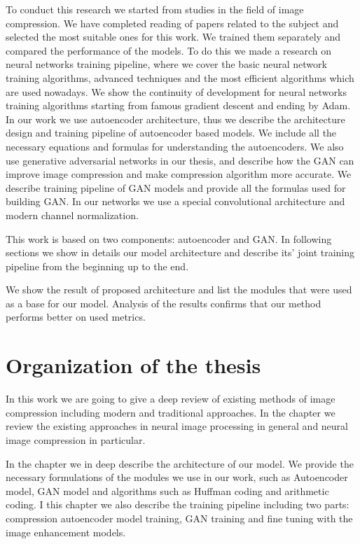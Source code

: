 To conduct this research we started from studies in the field of image compression. We have completed reading of papers related to the subject and selected the most suitable ones for this work. We trained them separately and compared the performance of the models. To do this we made a research on neural networks training pipeline, where we cover the basic neural network training algorithms, advanced techniques and the most efficient algorithms which are used nowadays. We show the continuity of development for neural networks training algorithms starting from famous gradient descent and ending by Adam. In our work we use autoencoder architecture, thus we describe the architecture design and training pipeline of autoencoder based models. We include all the necessary equations and formulas for understanding the autoencoders. We also use generative adversarial networks in our thesis, and describe how the GAN can improve image compression and make compression algorithm more accurate. We describe training pipeline of GAN models and provide all the formulas used for building GAN. In our networks we use a special convolutional architecture and modern channel normalization.

This work is based on two components: autoencoder and GAN. In following sections we show in details our model architecture and describe its' joint training pipeline from the beginning up to the end.

We show the result of proposed architecture and list the modules that were used as a base for our model. Analysis of the results confirms that our method performs better on used metrics.

\section{Organization of the thesis}

In this work we are going to give a deep review of existing methods of image compression including modern and traditional approaches. In the chapter  we review the existing approaches in neural image processing in general and neural image compression in particular.

In the chapter  we in deep describe the architecture of our model. We provide the necessary formulations of the modules we use in our work, such as Autoencoder model, GAN model and algorithms such as Huffman coding and arithmetic coding. I this chapter we also describe the training pipeline including two parts: compression autoencoder model training, GAN training and fine tuning with the image enhancement models.

